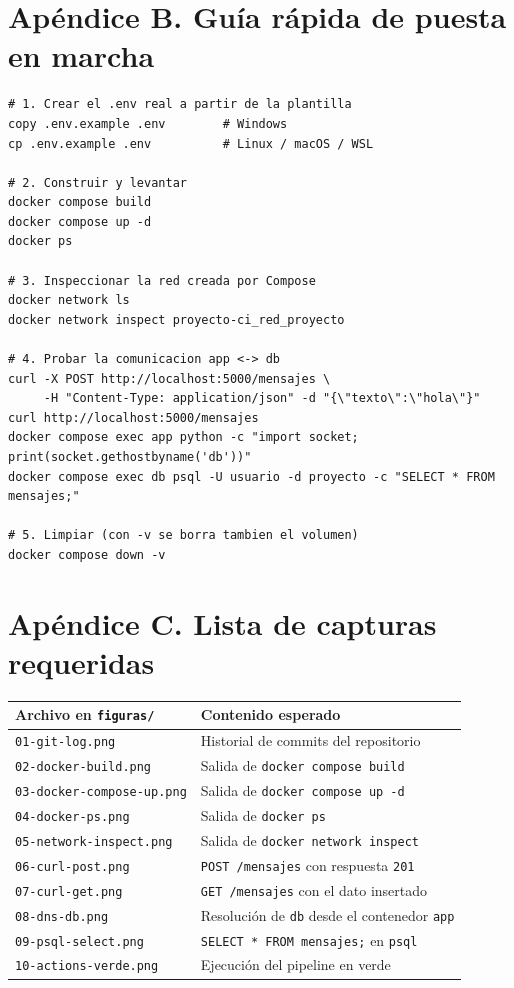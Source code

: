\documentclass[12pt,a4paper]{article}
\begin{document}
\section{Ap\'endice B. Gu\'ia r\'apida de puesta en marcha}

\begin{lstlisting}[caption=Secuencia de comandos de la Entrega 1,style=estiloshell]
# 1. Crear el .env real a partir de la plantilla
copy .env.example .env        # Windows
cp .env.example .env          # Linux / macOS / WSL

# 2. Construir y levantar
docker compose build
docker compose up -d
docker ps

# 3. Inspeccionar la red creada por Compose
docker network ls
docker network inspect proyecto-ci_red_proyecto

# 4. Probar la comunicacion app <-> db
curl -X POST http://localhost:5000/mensajes \
     -H "Content-Type: application/json" -d "{\"texto\":\"hola\"}"
curl http://localhost:5000/mensajes
docker compose exec app python -c "import socket; print(socket.gethostbyname('db'))"
docker compose exec db psql -U usuario -d proyecto -c "SELECT * FROM mensajes;"

# 5. Limpiar (con -v se borra tambien el volumen)
docker compose down -v
\end{lstlisting}

\section{Ap\'endice C. Lista de capturas requeridas}

\begin{center}
\begin{tabularx}{\textwidth}{l X}
\toprule
\textbf{Archivo en \texttt{figuras/}} & \textbf{Contenido esperado} \\
\midrule
\texttt{01-git-log.png} & Historial de commits del repositorio \\
\texttt{02-docker-build.png} & Salida de \texttt{docker compose build} \\
\texttt{03-docker-compose-up.png} & Salida de \texttt{docker compose up -d} \\
\texttt{04-docker-ps.png} & Salida de \texttt{docker ps} \\
\texttt{05-network-inspect.png} & Salida de \texttt{docker network inspect} \\
\texttt{06-curl-post.png} & \texttt{POST /mensajes} con respuesta \texttt{201} \\
\texttt{07-curl-get.png} & \texttt{GET /mensajes} con el dato insertado \\
\texttt{08-dns-db.png} & Resoluci\'on de \texttt{db} desde el contenedor \texttt{app} \\
\texttt{09-psql-select.png} & \texttt{SELECT * FROM mensajes;} en \texttt{psql} \\
\texttt{10-actions-verde.png} & Ejecuci\'on del pipeline en verde \\
\bottomrule
\end{tabularx}
\end{center}
\end{document}
